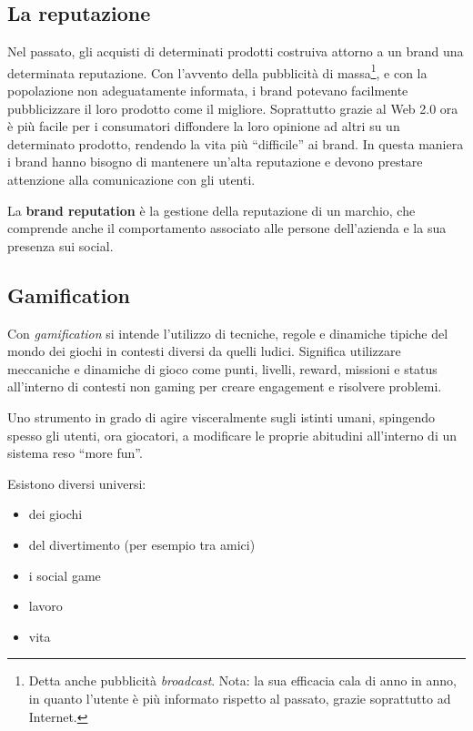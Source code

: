 \subsection{La reputazione}

Nel passato, gli acquisti di determinati prodotti costruiva attorno a un brand
una determinata reputazione. Con l'avvento della pubblicità di
massa\footnote{Detta anche pubblicità \textit{broadcast}. Nota: la sua
efficacia cala di anno in anno, in quanto l'utente è più informato rispetto al
passato, grazie soprattutto ad Internet.}, e con la popolazione non
adeguatamente informata, i brand potevano facilmente pubblicizzare
il loro prodotto come il migliore. Soprattutto grazie al Web 2.0 ora
è più facile per i consumatori diffondere la loro opinione ad altri su un
determinato prodotto, rendendo la vita più ``difficile'' ai brand. In questa
maniera i brand hanno bisogno di mantenere un'alta reputazione e devono
prestare attenzione alla comunicazione con gli utenti.

La \textbf{brand reputation} è la gestione della reputazione di un marchio, che
comprende anche il comportamento associato alle persone dell'azienda e la sua
presenza sui social.

\subsection{Gamification}

Con \emph{gamification} si intende l'utilizzo di tecniche, regole e dinamiche
tipiche del mondo dei giochi in contesti diversi da quelli ludici.
Significa utilizzare meccaniche e dinamiche di gioco come punti, livelli,
reward, missioni e status all'interno di contesti non gaming per creare
engagement e risolvere problemi.

Uno strumento in grado di agire visceralmente sugli istinti umani, spingendo
spesso gli utenti, ora giocatori, a modificare le proprie abitudini all’interno
di un sistema reso ``more fun''.

Esistono diversi universi:
\begin{itemize}
 \item dei giochi
 \item del divertimento (per esempio tra amici)
 \item i social game
 \item lavoro
 \item vita
\end{itemize}

